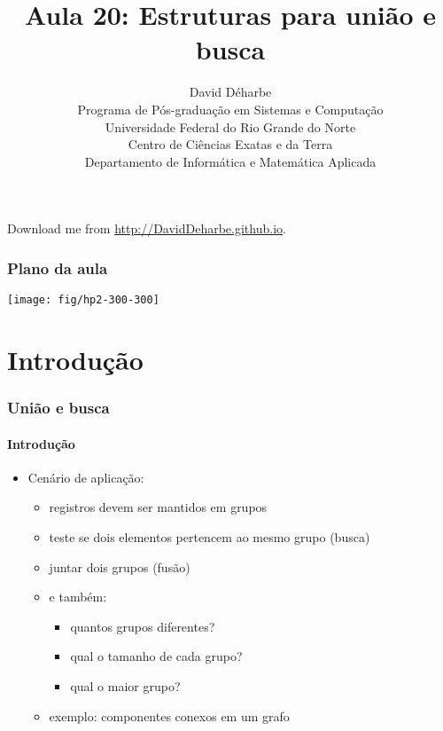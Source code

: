 \documentclass{beamer}
\title{Aula 20: Estruturas para união e busca}
\author{David Déharbe \\
  Programa de Pós-graduação em Sistemas e Computação \\
  Universidade Federal do Rio Grande do Norte \\
  Centro de Ciências Exatas e da Terra \\
  Departamento de Informática e Matemática Aplicada}
\date{}
\begin{document}
\begin{frame}
  \titlepage
  Download me from \url{http://DavidDeharbe.github.io}.
\end{frame}

\begin{frame}
  \frametitle{Plano da aula}

\begin{center}
  \texttt{[image: fig/hp2-300-300]}
\end{center}

  \tableofcontents

\end{frame}

\section{Introdução}

\begin{frame}

  \frametitle{União e busca}
  \framesubtitle{Introdução}

  
  \begin{itemize}
    
  \item Cenário de aplicação:

    \begin{itemize}

      \item registros devem ser mantidos em grupos

      \item teste se dois elementos pertencem ao mesmo grupo (\alert{busca})

      \item juntar dois grupos (\alert{fusão})

      \item e também: 

        \begin{itemize}

          \item quantos grupos diferentes? 

          \item qual o tamanho de cada grupo?

          \item qual o maior grupo? 

        \end{itemize}

      \item exemplo: componentes conexos em um grafo

    \end{itemize}

\end{itemize}

\end{frame}
\end{document}
